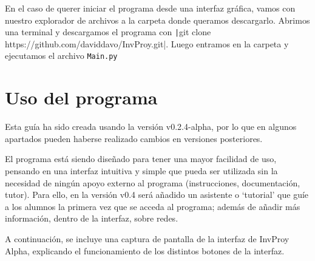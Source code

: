 \documentclass[a4paper, 11pt]{report} %
\begin{document}
En el caso de querer iniciar el programa desde una interfaz gráfica, vamos con nuestro explorador de archivos a la carpeta donde queramos descargarlo. Abrimos una terminal y descargamos el programa con \texttt|git clone https://github.com/daviddavo/InvProy.git|. Luego entramos en la carpeta y ejecutamos el archivo \texttt{Main.py}
\section{Uso del programa}
Esta guía ha sido creada usando la versión v0.2.4-alpha, por lo que en algunos apartados pueden haberse realizado cambios en versiones posteriores.

El programa está siendo diseñado para tener una mayor facilidad de uso, pensando en una interfaz intuitiva y simple que pueda ser utilizada sin la necesidad de ningún apoyo externo al programa (instrucciones, documentación, tutor). Para ello, en la versión v0.4 será añadido un asistente o `tutorial' que guíe a los alumnos la primera vez que se acceda al programa; además de añadir más información, dentro de la interfaz, sobre redes.

A continuación, se incluye una captura de pantalla de la interfaz de InvProy Alpha, explicando el funcionamiento de los distintos botones de la interfaz.
\end{document}
